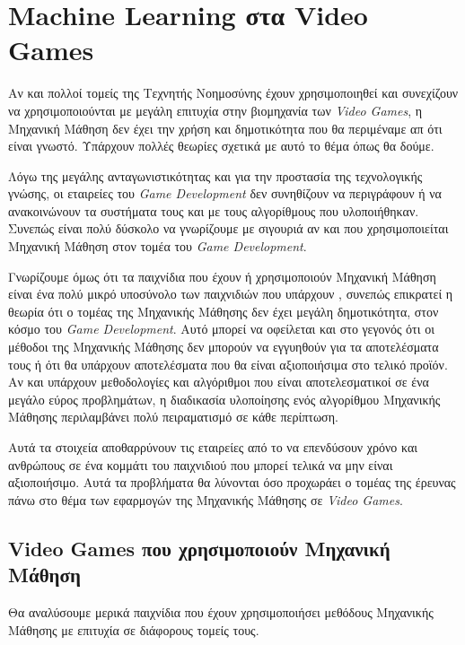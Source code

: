 \section{Machine Learning στα Video Games}
Αν και πολλοί τομείς της Τεχνητής Νοημοσύνης έχουν χρησιμοποιηθεί και συνεχίζουν να χρησιμοποιούνται με μεγάλη επιτυχία στην βιομηχανία των \textit{Video Games}, η Μηχανική Μάθηση δεν έχει την χρήση και δημοτικότητα που θα περιμέναμε απ ότι είναι γνωστό. Υπάρχουν πολλές θεωρίες σχετικά με αυτό το θέμα όπως θα δούμε. 
\par
Λόγω της μεγάλης ανταγωνιστικότητας και για την προστασία της τεχνολογικής γνώσης, οι εταιρείες του \textit{Game Development} δεν συνηθίζουν να περιγράφουν ή να ανακοινώνουν τα συστήματα τους και με τους αλγορίθμους που υλοποιήθηκαν. Συνεπώς είναι πολύ δύσκολο να γνωρίζουμε με σιγουριά αν και που χρησιμοποιείται Μηχανική Μάθηση στον τομέα του \textit{Game Development}.
\par
Γνωρίζουμε όμως ότι τα παιχνίδια που έχουν ή χρησιμοποιούν Μηχανική Μάθηση είναι ένα πολύ μικρό υποσύνολο των παιχνιδιών που υπάρχουν , συνεπώς επικρατεί η θεωρία ότι ο τομέας της Μηχανικής Μάθησης δεν έχει μεγάλη δημοτικότητα, στον κόσμο του \textit{Game Development}.  Αυτό μπορεί να οφείλεται και στο γεγονός ότι οι μέθοδοι της Μηχανικής Μάθησης δεν μπορούν να εγγυηθούν για τα αποτελέσματα τους ή ότι θα υπάρχουν αποτελέσματα που θα είναι αξιοποιήσιμα στο τελικό προϊόν. Αν και υπάρχουν μεθοδολογίες και αλγόριθμοι που είναι αποτελεσματικοί σε ένα μεγάλο εύρος προβλημάτων, η διαδικασία υλοποίησης ενός αλγορίθμου Μηχανικής Μάθησης περιλαμβάνει πολύ πειραματισμό σε κάθε περίπτωση.
\par
Αυτά τα στοιχεία αποθαρρύνουν τις εταιρείες από το να επενδύσουν χρόνο και ανθρώπους σε ένα κομμάτι του παιχνιδιού που μπορεί τελικά να μην είναι αξιοποιήσιμο. Αυτά τα προβλήματα θα λύνονται όσο προχωράει ο τομέας της έρευνας πάνω στο θέμα των εφαρμογών της Μηχανικής Μάθησης σε \textit{Video Games}.  \cite{mlandgames}

\subsection{Video Games που χρησιμοποιούν Μηχανική Μάθηση}
Θα αναλύσουμε μερικά παιχνίδια που έχουν χρησιμοποιήσει μεθόδους Μηχανικής Μάθησης με επιτυχία σε διάφορους τομείς τους.


